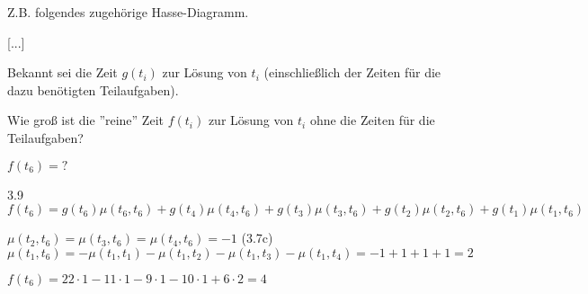 		Z.B. folgendes zugehörige Hasse-Diagramm.
		
		[...]
		
		Bekannt sei die Zeit $g(t_i)$ zur Lösung von $t_i$ (einschließlich der Zeiten für die dazu benötigten Teilaufgaben).
		
		Wie groß ist die ''reine'' Zeit $f(t_i)$ zur Lösung von $t_i$ ohne die Zeiten für die Teilaufgaben?
		
		$f(t_6) = ?$
		
		3.9 %
		$f(t_6) = g(t_6)\mu(t_6, t_6)
		+ g(t_4)\mu(t_4, t_6) 
		+ g(t_3)\mu(t_3, t_6)
		+ g(t_2)\mu(t_2, t_6)
		+ g(t_1)\mu(t_1, t_6) $
		
		$\mu(t_2, t_6) = \mu(t_3, t_6) = \mu(t_4, t_6) = -1$ (3.7c) %
		\\$\mu(t_1, t_6) = -\mu(t_1, t_1) - \mu(t_1, t_2) - \mu(t_1, t_3) - \mu(t_1, t_4) = -1 + 1 + 1 +1 = 2$
		
		$f(t_6) = 22 \cdot 1 - 11 \cdot 1 - 9 \cdot 1 - 10 \cdot 1 + 6 \cdot 2 = 4$	
		
		